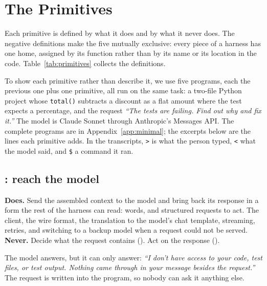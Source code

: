 \section{The Primitives}
\label{sec:primitives}

Each primitive is defined by what it does and by what it never does. The negative definitions make the five mutually exclusive: every piece of a harness has one home, assigned by its function rather than by its name or its location in the code. Table~\ref{tab:primitives} collects the definitions.

To show each primitive rather than describe it, we use five programs, each the previous one plus one primitive, all run on the same task: a two-file Python project whose \texttt{total()} subtracts a discount as a flat amount where the test expects a percentage, and the request \emph{``The tests are failing. Find out why and fix it.''} The model is Claude Sonnet through Anthropic's Messages API. The complete programs are in Appendix~\ref{app:minimal}; the excerpts below are the lines each primitive adds. In the transcripts, \texttt{>} is what the person typed, \texttt{<} what the model said, and \texttt{\$} a command it ran.

\newcommand{\transcript}{\lstset{language={},basicstyle=\ttfamily\scriptsize,breaklines=true,breakindent=1.5em,frame=none,commentstyle=\ttfamily,keywordstyle=\ttfamily,stringstyle=\ttfamily}}

\subsection{: reach the model}
\textbf{Does.} Send the assembled context to the model and bring back its response in a form the rest of the harness can read: words, and structured requests to act. The client, the wire format, the translation to the model's chat template, streaming, retries, and switching to a backup model when a request could not be served.
\textbf{Never.} Decide what the request contains (). Act on the response ().


The model answers, but it can only answer: \emph{``I don't have access to your code, test files, or test output. Nothing came through in your message besides the request.''} The request is written into the program, so nobody can ask it anything else.

